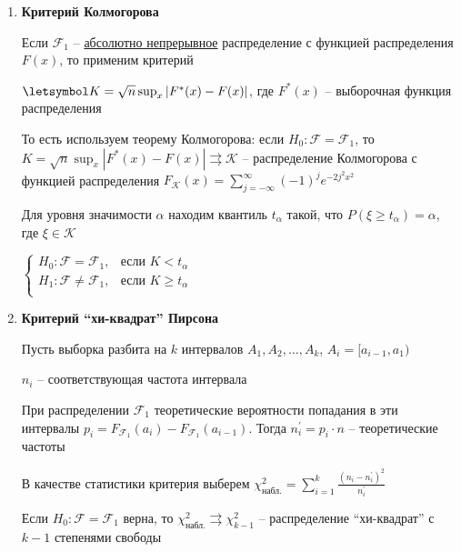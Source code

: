 \begin{enumerate}[label*=\Roman*. ]
    \hypertarget{kolmogorovs_criterion}{}

    \item \textbf{Критерий Колмогорова}

    Если $\mathcal{F}_1$ -- \underline{абсолютно непрерывное} распределение с функцией распределения $F(x)$, то применим критерий

    $\letsymbol K = \sqrt{n} \sup_x |F^*(x) - F(x)|$, где $F^*(x)$ -- выборочная функция распределения

    То есть используем теорему Колмогорова: если $H_0 : \mathcal{F} = \mathcal{F}_1$, то $K =\sqrt{n} \sup_x |F^*(x) - F(x)| 
    \rightrightarrows \mathcal{K}$ -- распределение Колмогорова 
    с функцией распределения $F_\mathcal{K}(x) = \sum_{j = -\infty}^\infty (-1)^j e^{-2j^2 x^2}$

    Для уровня значимости $\alpha$ находим квантиль $t_\alpha$ такой, что $P(\xi \geq t_\alpha) = \alpha$, 
    где $\xi \in \mathcal{K}$

    $\begin{cases}
        H_0 : \mathcal{F} = \mathcal{F}_1, & \text{если } K < t_\alpha \\
        H_1 : \mathcal{F} \neq \mathcal{F}_1, & \text{если } K \geq t_\alpha \\
    \end{cases}$

    \hypertarget{chi_square_criterion}{}

    \item \textbf{Критерий \enquote{хи-квадрат} Пирсона}

    Пусть выборка разбита на $k$ интервалов $A_1, A_2, \dots, A_k$, $A_i = [a_{i - 1}, a_1)$

    $n_i$ -- соответствующая частота интервала

    При распределении $\mathcal{F}_1$ теоретические вероятности попадания в эти интервалы $p_i = F_{\mathcal{F}_1}(a_i) - F_{\mathcal{F}_1}(a_{i - 1})$.
    Тогда $n_i^\prime = p_i \cdot n$ -- теоретические частоты


    В качестве статистики критерия выберем $\chi^2_\text{набл.} = \sum_{i = 1}^k \frac{(n_i - n_i^\prime)^2}{n_i^\prime}$

    \begin{MyTheorem}
         Если $H_0 : \mathcal{F} = \mathcal{F}_1$ верна, то $\chi^2_\text{набл.} \rightrightarrows \chi^2_{k - 1}$ -- 
        распределение \enquote{хи-квадрат} с $k - 1$ степенями свободы
    \end{MyTheorem}


\end{enumerate}
